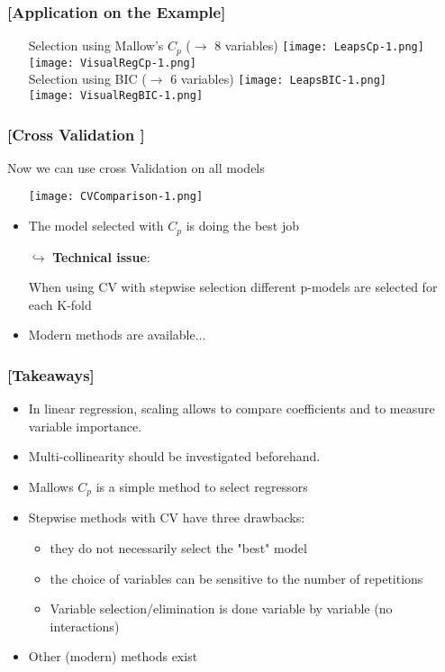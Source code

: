 \documentclass[xcolor=x11names,compress]{beamer}
\renewcommand{\(}{\begin{columns}}
\renewcommand{\)}{\end{columns}}
\newcommand{\<}[1]{\begin{column}{#1}}
\renewcommand{\>}{\end{column}}
\begin{document}
\begin{frame} %
\frametitle{\textcolor{brique}{[Application on the Example]}}
\pause
\begin{itemize}
  \item[]
   {Selection using Mallow's $C_p$ ($\rightarrow $ 8 variables) }
   { \texttt{[image: LeapsCp-1.png]} \\ }
   { \texttt{[image: VisualRegCp-1.png]} \\ }
   {Selection using BIC ($\rightarrow $ 6 variables) }
   { \texttt{[image: LeapsBIC-1.png]} \\ }
   { \texttt{[image: VisualRegBIC-1.png]} \\ }
\end{itemize}
\end{frame}

\begin{frame} %
\frametitle{\textcolor{brique}{[Cross Validation ]}}
Now we can use cross Validation on all  models
\pause
\begin{itemize}[<+->]
  \item[] \texttt{[image: CVComparison-1.png]}
  \item The model selected with $C_p$ is doing the best job
  \item[$\hookrightarrow$] \textbf{Technical issue}:
  \item[]  When using CV with stepwise selection different p-models are selected for each K-fold
  \item Modern methods are available...
\end{itemize}
\end{frame}

\begin{frame} %
\frametitle{\textcolor{brique}{[Takeaways]}}
\begin{itemize}[<+->]
\item In linear regression, scaling allows to compare coefficients and to measure variable importance.
\item Multi-collinearity should be investigated beforehand.
\item Mallows $C_p$ is a simple method to select regressors
\item Stepwise methods with CV have three drawbacks:
    \begin{itemize}[<+->]
        \item they do not necessarily select the "best" model
        \item the choice of variables can be sensitive to the number of repetitions
        \item Variable selection/elimination is done variable by variable (no interactions)
    \end{itemize}
\item Other (modern) methods exist
\end{itemize}
\end{frame}
\end{document}
